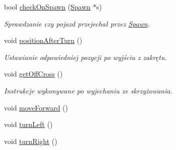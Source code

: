 \begin{DoxyCompactItemize}
bool \hyperlink{class_vehicle_af82b6feefaf07705011aca15835c940f}{check\-On\-Spawn} (\hyperlink{class_spawn}{Spawn} $\ast$s)
\begin{DoxyCompactList}\small\item\em Sprawdzanie czy pojazd przejechał przez \hyperlink{class_spawn}{Spawn}. \end{DoxyCompactList}\item 
void \hyperlink{class_vehicle_a3baf18e6b6b8f3c9a16a4d93ea16c46c}{position\-After\-Turn} ()
\begin{DoxyCompactList}\small\item\em Ustawianie odpowiedniej pozycji po wyjściu z zakrętu. \end{DoxyCompactList}\item 
void \hyperlink{class_vehicle_a85071a892f7e2b731e40d159897e21ec}{get\-Off\-Cross} ()
\begin{DoxyCompactList}\small\item\em Instrukcje wykonywane po wyjechaniu ze skrzyżowania. \end{DoxyCompactList}\item 
void \hyperlink{class_vehicle_af2e6c030a5be66b6fd669216fdb76b74}{move\-Forward} ()
\item 
void \hyperlink{class_vehicle_a862a647913e72fdfcbc5698486d4674d}{turn\-Left} ()
\item 
void \hyperlink{class_vehicle_a5a0f5be9d10f110b69d4f9680610403a}{turn\-Right} ()
\end{DoxyCompactItemize}
